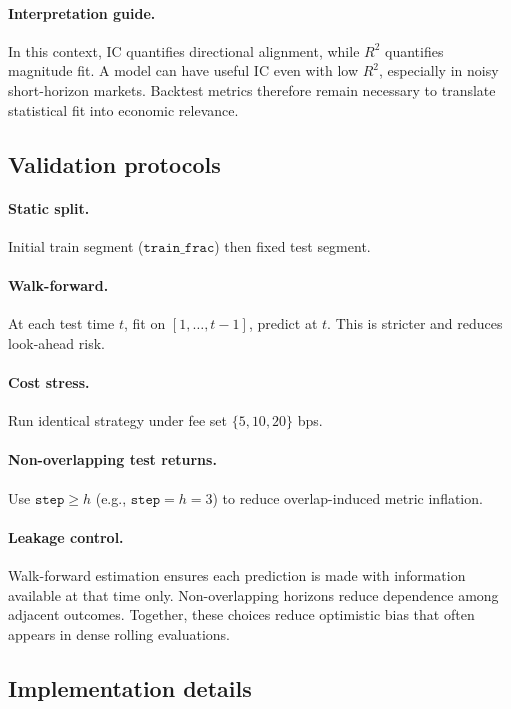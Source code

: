 \documentclass[11pt]{article}
\begin{document}
\paragraph{Interpretation guide.}
In this context, IC quantifies directional alignment, while \(R^2\) quantifies magnitude fit. A model can have useful IC even with low \(R^2\), especially in noisy short-horizon markets. Backtest metrics therefore remain necessary to translate statistical fit into economic relevance.

\subsection{Validation protocols}
\paragraph{Static split.}
Initial train segment (\(\texttt{train\_frac}\)) then fixed test segment.

\paragraph{Walk-forward.}
At each test time \(t\), fit on \([1,\dots,t-1]\), predict at \(t\).  
This is stricter and reduces look-ahead risk.

\paragraph{Cost stress.}
Run identical strategy under fee set \(\{5,10,20\}\) bps.

\paragraph{Non-overlapping test returns.}
Use \(\texttt{step}\ge h\) (e.g., \(\texttt{step}=h=3\)) to reduce overlap-induced metric inflation.
\paragraph{Leakage control.}
Walk-forward estimation ensures each prediction is made with information available at that time only. Non-overlapping horizons reduce dependence among adjacent outcomes. Together, these choices reduce optimistic bias that often appears in dense rolling evaluations.

\subsection{Implementation details}
\end{document}
